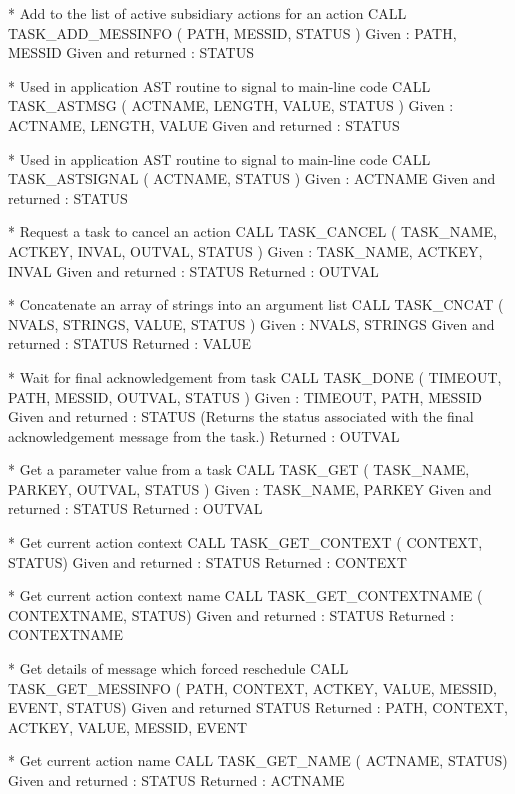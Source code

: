 \documentclass[twoside,11pt,nolof]{starlink}
\begin{document}
\begin{terminalv}
*  Add to the list of active subsidiary actions for an action
CALL TASK_ADD_MESSINFO ( PATH, MESSID, STATUS )
Given : PATH, MESSID
Given and returned : STATUS

*  Used in application AST routine to signal to main-line code
CALL TASK_ASTMSG ( ACTNAME, LENGTH, VALUE, STATUS )
Given : ACTNAME, LENGTH, VALUE
Given and returned : STATUS

*  Used in application AST routine to signal to main-line code
CALL TASK_ASTSIGNAL ( ACTNAME, STATUS )
Given : ACTNAME
Given and returned : STATUS
\end{terminalv}
\newpage
\begin{terminalv}
*  Request a task to cancel an action
CALL TASK_CANCEL ( TASK_NAME, ACTKEY, INVAL, OUTVAL, STATUS )
Given : TASK_NAME, ACTKEY, INVAL
Given and returned : STATUS
Returned : OUTVAL

*  Concatenate an array of strings into an argument list
CALL TASK_CNCAT ( NVALS, STRINGS, VALUE, STATUS )
Given : NVALS, STRINGS
Given and returned : STATUS
Returned : VALUE

*  Wait for final acknowledgement from task
CALL TASK_DONE ( TIMEOUT, PATH, MESSID, OUTVAL, STATUS )
Given : TIMEOUT, PATH, MESSID
Given and returned : STATUS (Returns the status associated with the final
                     acknowledgement message from the task.)
Returned : OUTVAL

*  Get a parameter value from a task
CALL TASK_GET ( TASK_NAME, PARKEY, OUTVAL, STATUS )
Given : TASK_NAME, PARKEY
Given and returned : STATUS
Returned : OUTVAL

*  Get current action context
CALL TASK_GET_CONTEXT ( CONTEXT, STATUS)
Given and returned : STATUS
Returned : CONTEXT

*  Get current action context name
CALL TASK_GET_CONTEXTNAME ( CONTEXTNAME, STATUS)
Given and returned : STATUS
Returned : CONTEXTNAME

*  Get details of message which forced reschedule
CALL TASK_GET_MESSINFO ( PATH, CONTEXT, ACTKEY, VALUE, MESSID, EVENT, STATUS)
Given and returned STATUS
Returned : PATH, CONTEXT, ACTKEY, VALUE, MESSID, EVENT

*  Get current action name
CALL TASK_GET_NAME ( ACTNAME, STATUS)
Given and returned : STATUS
Returned : ACTNAME
\end{terminalv}
\newpage
\end{document}
